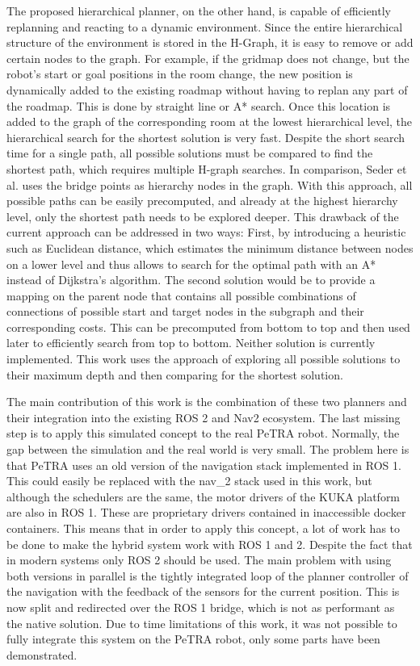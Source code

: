 The proposed hierarchical planner, on the other hand, is capable of efficiently replanning and reacting to a dynamic environment. Since the entire hierarchical structure of the environment is stored in the H-Graph, it is easy to remove or add certain nodes to the graph. For example, if the gridmap does not change, but the robot's start or goal positions in the room change, the new position is dynamically added to the existing roadmap without having to replan any part of the roadmap. This is done by straight line or A* search. Once this location is added to the graph of the corresponding room at the lowest hierarchical level, the hierarchical search for the shortest solution is very fast. Despite the short search time for a single path, all possible solutions must be compared to find the shortest path, which requires multiple H-graph searches. In comparison, Seder et al. \cite{seder_hierarchical_2011} uses the bridge points as hierarchy nodes in the graph. With this approach, all possible paths can be easily precomputed, and already at the highest hierarchy level, only the shortest path needs to be explored deeper. This drawback of the current approach can be addressed in two ways: First, by introducing a heuristic such as Euclidean distance, which estimates the minimum distance between nodes on a lower level and thus allows to search for the optimal path with an A* instead of Dijkstra's algorithm. The second solution would be to provide a mapping on the parent node that contains all possible combinations of connections of possible start and target nodes in the subgraph and their corresponding costs. This can be precomputed from bottom to top and then used later to efficiently search from top to bottom. Neither solution is currently implemented. This work uses the approach of exploring all possible solutions to their maximum depth and then comparing for the shortest solution.

The main contribution of this work is the combination of these two planners and their integration into the existing ROS 2 and Nav2 ecosystem. The last missing step is to apply this simulated concept to the real PeTRA robot. Normally, the gap between the simulation and the real world is very small. The problem here is that PeTRA uses an old version of the navigation stack implemented in ROS 1. This could easily be replaced with the \gls{nav_2} stack used in this work, but although the schedulers are the same, the motor drivers of the KUKA platform are also in ROS 1. These are proprietary drivers contained in inaccessible docker containers. This means that in order to apply this concept, a lot of work has to be done to make the hybrid system work with ROS 1 and 2. Despite the fact that in modern systems only ROS 2 should be used. The main problem with using both versions in parallel is the tightly integrated loop of the planner controller of the navigation with the feedback of the sensors for the current position. This is now split and redirected over the ROS 1 bridge, which is not as performant as the native solution. Due to time limitations of this work, it was not possible to fully integrate this system on the PeTRA robot, only some parts have been demonstrated.

